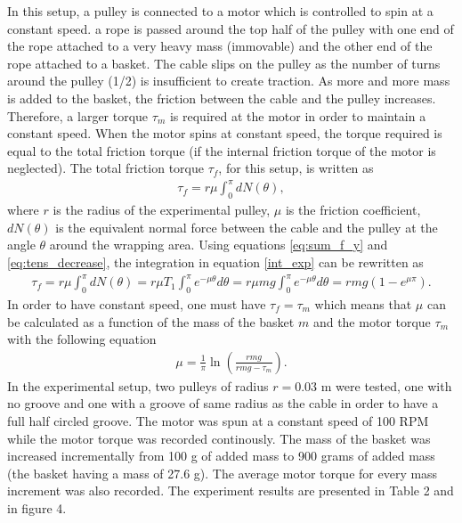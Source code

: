\documentclass[10pt,cleanfoot]{asme2ej}
\begin{document}
In this setup, a pulley is connected to a motor which is controlled to spin at a constant speed. a rope is passed around the top half of the pulley with one end of the rope attached to a very heavy mass (immovable) and the other end of the rope attached to a basket. The cable slips on the pulley as the number of turns around the pulley (1/2) is insufficient to create traction. As more and more mass is added to the basket, the friction between the cable and the pulley increases. Therefore, a larger torque $\tau_m$ is required at the motor in order to maintain a constant speed. When the motor spins at constant speed, the torque required is equal to the total friction torque (if the internal friction torque of the motor is neglected). The total friction torque $\tau_f$, for this setup, is written as 
\begin{align}
\tau_f = r\mu\int_0^\pi dN(\theta),
\label{int_exp}
\end{align}where $r$ is the radius of the experimental pulley, $\mu$ is the friction coefficient, $dN(\theta)$ is the equivalent normal force between the cable and the pulley at the angle $\theta$ around the wrapping area. Using equations \eqref{eq:sum_f_y} and \eqref{eq:tens_decrease}, the integration in equation \eqref{int_exp} can be rewritten as 
\begin{align}
\tau_f = r\mu\int_0^\pi dN(\theta) = r\mu T_1\int_0^\pi e^{-\mu\theta}d\theta = r\mu mg\int_0^\pi e^{-\mu\theta}d\theta = rmg\left(1-e^{\mu\pi}\right).
\end{align}
In order to have constant speed, one must have $\tau_f = \tau_m$ which means that $\mu$ can be calculated as a function of the mass of the basket $m$ and the motor torque $\tau_m$ with the following equation
\begin{align}
\mu = \frac{1}{\pi}\ln\left({\frac{rmg}{rmg-\tau_m}}\right).
\end{align} 
In the experimental setup, two pulleys of radius $r=0.03$ m were tested, one with no groove and one with a groove of same radius as the cable in order to have a full half circled groove. The motor was spun at a constant speed of 100 RPM while the motor torque was recorded continously. The mass of the basket was increased incrementally from 100 g of added mass to 900 grams of added mass (the basket having a mass of 27.6 g). The average motor torque for every mass increment was also recorded. The experiment results are presented in Table 2 and in figure 4.
\end{document}
